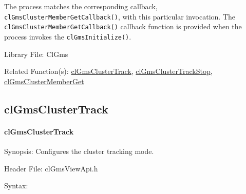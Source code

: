 \begin{flushleft}
\begin{Desc}
 \par
 The process matches the corresponding callback, {\tt{cl\-Gms\-Cluster\-Member\-Get\-Callback()}},
 with this particular invocation. The {\tt{cl\-Gms\-Cluster\-Member\-Get\-Callback()}} callback function is provided when
 the process invokes the {\tt{clGmsInitialize()}}.\end{Desc}
\begin{Desc}
\item[Library File:]Cl\-Gms\end{Desc}
\begin{Desc}
\item[Related Function(s):]\hyperlink{pagegms103}{cl\-Gms\-Cluster\-Track}, \hyperlink{pagegms104}{cl\-Gms\-Cluster\-Track\-Stop},
\hyperlink{pagegms110}{cl\-Gms\-Cluster\-Member\-Get} \end{Desc}

\newpage
\subsection{clGmsClusterTrack}
\hypertarget{pagegms103}{}\paragraph{cl\-Gms\-Cluster\-Track}\label{pagegms103}
\begin{Desc}
\item[Synopsis:]Configures the cluster tracking mode.\end{Desc}
\begin{Desc}
\item[Header File:]clGmsViewApi.h\end{Desc}
\begin{Desc}
\item[Syntax:]


\end{Desc}
\end{flushleft}

